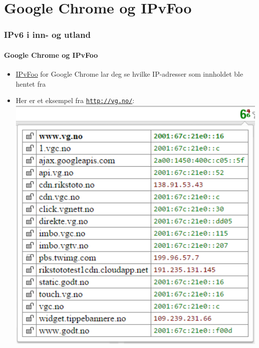 \section{Google Chrome og IPvFoo}
\begin{frame}%
  \frametitle{IPv6 i inn- og utland}
  \framesubtitle{Google Chrome og IPvFoo}
  \begin{itemize}%
  \item \href{https://code.google.com/p/ipvfoo/}{IPvFoo} for Google
    Chrome lar deg se hvilke IP-adresser som innholdet ble hentet fra
  \item Her er et eksempel fra \texttt{\url{http://vg.no/}}:\\
  \includegraphics[scale=.4]{vg-dot-no-og-IPvFoo-i-Google-Chrome.pdf}
  \end{itemize}
\end{frame}

